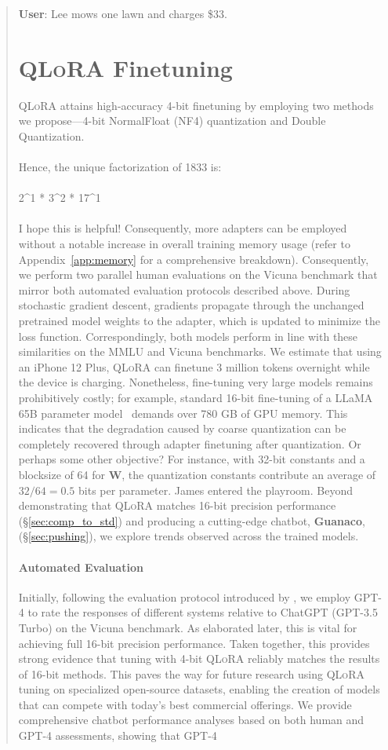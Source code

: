 \begin{quote}
    \textbf{User}: Lee mows one lawn and charges \$33. \section{\textsc{QLoRA} Finetuning}

\textsc{QLoRA} attains high-accuracy 4-bit finetuning by employing two methods we propose—4-bit NormalFloat (NF4) quantization and Double Quantization. \\ \\ Hence, the unique factorization of 1833 is: \\ \\ 2\^{}1 * 3\^{}2 * 17\^{}1 \\ \\ I hope this is helpful! Consequently, more adapters can be employed without a notable increase in overall training memory usage (refer to Appendix~\ref{app:memory} for a comprehensive breakdown). Consequently, we perform two parallel human evaluations on the Vicuna benchmark that mirror both automated evaluation protocols described above. During stochastic gradient descent, gradients propagate through the unchanged pretrained model weights to the adapter, which is updated to minimize the loss function. Correspondingly, both models perform in line with these similarities on the MMLU and Vicuna benchmarks. We estimate that using an iPhone 12 Plus, \textsc{QLoRA} can finetune 3 million tokens overnight while the device is charging. Nonetheless, fine-tuning very large models remains prohibitively costly; for example, standard 16-bit fine-tuning of a LLaMA 65B parameter model~\citep{touvron2023llama} demands over 780 GB of GPU memory. This indicates that the degradation caused by coarse quantization can be completely recovered through adapter finetuning after quantization. Or perhaps some other objective? For instance, with 32-bit constants and a blocksize of 64 for $\mathbf{W}$, the quantization constants contribute an average of $32/64 = 0.5$ bits per parameter. James entered the playroom. Beyond demonstrating that \textsc{QLoRA} matches 16-bit precision performance (\S\ref{sec:comp_to_std}) and producing a cutting-edge chatbot, \textbf{Guanaco}, (\S\ref{sec:pushing}), we explore trends observed across the trained models. \paragraph{Automated Evaluation} Initially, following the evaluation protocol introduced by \citet{vicuna2023}, we employ GPT-4 to rate the responses of different systems relative to ChatGPT (GPT-3.5 Turbo) on the Vicuna benchmark. As elaborated later, this is vital for achieving full 16-bit precision performance. Taken together, this provides strong evidence that tuning with 4-bit \textsc{QLoRA} reliably matches the results of 16-bit methods. This paves the way for future research using \textsc{QLoRA} tuning on specialized open-source datasets, enabling the creation of models that can compete with today’s best commercial offerings. We provide comprehensive chatbot performance analyses based on both human and GPT-4 assessments, showing that GPT-4 
\end{quote}
